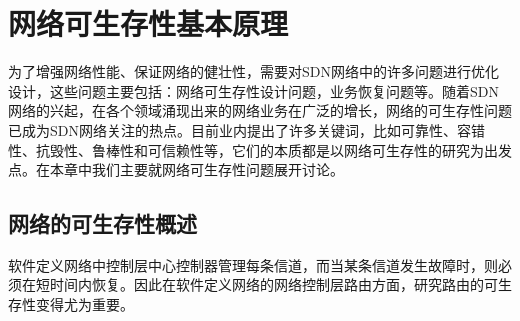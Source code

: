 
\chapter{网络可生存性基本原理}
为了增强网络性能、保证网络的健壮性，需要对SDN网络中的许多问题进行优化设计，这些问题主要包括：网络可生存性设计问题，业务恢复问题等。随着SDN 网络的兴起，在各个领域涌现出来的网络业务在广泛的增长，网络的可生存性问题已成为SDN网络关注的热点。目前业内提出了许多关键词，比如可靠性、容错性、抗毁性、鲁棒性和可信赖性等，它们的本质都是以网络可生存性的研究为出发点。在本章中我们主要就网络可生存性问题展开讨论。



\section{网络的可生存性概述}
软件定义网络中控制层中心控制器管理每条信道，而当某条信道发生故障时，则必须在短时间内恢复。因此在软件定义网络的网络控制层路由方面，研究路由的可生存性变得尤为重要。







